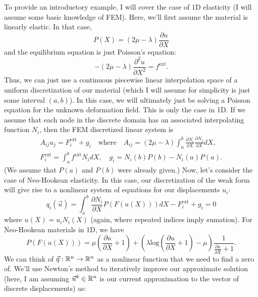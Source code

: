 To provide an introductory example, I will cover the case of 1D elasticity (I will assume some basic knowledge of FEM). Here, we'll first assume the material is linearly elastic. In that case,
\begin{equation*}
P(X) = \left( 2 \mu - \lambda \right) \frac{\partial u}{\partial X}
\end{equation*}
and the equilibrium equation is just Poisson's equation:
\begin{equation*}
-\left( 2 \mu - \lambda \right) \frac{\partial^2 u}{\partial X^2} = f^{\text{ext}}.
\end{equation*}
Thus, we can just use a continuous piecewise linear interpolation space of a uniform discretization of our material (which I will assume for simplicity is just some interval $(a,b)$). In this case, we will ultimately just be solving a Poisson equation for the unknown deformation field. This is only the case in 1D. If we assume that each node in the discrete domain has an associated interpolating function $N_i$, then the FEM discretized linear system is
\begin{gather*}
A_{ij} u_j = F^{\text{ext}}_i + g_i \quad \text{where} \quad A_{ij} = \left( 2 \mu - \lambda \right) \int_a^b \frac{\partial N_i}{\partial X}\frac{\partial N_j}{\partial X} dX, \\
F^{\text{ext}}_i = \int_a^b f^{\text{ext}} N_i dX, \quad g_i = N_i(b) P(b) - N_i(a) P(a).
\end{gather*}
(We assume that $P(a)$ and $P(b)$ were already given.) Now, let's consider the case of Neo-Hookean elasticity. In this case, our discretization of the weak form will give rise to a nonlinear system of equations for our displacements $u_i$:
\begin{equation*}
q_i \left( \vec{u} \right) = \int_a^b \frac{\partial N_i}{\partial X} P(F(u(X))) dX - F^{\text{ext}}_i + g_i = 0
\end{equation*}
where $u(X) = u_i N_i(X)$ (again, where repeated indices imply sumation). For Neo-Hookean materials in 1D, we have
\begin{equation*}
P(F(u(X))) = \mu \left( \frac{\partial u}{\partial X} + 1 \right) + \left( \lambda \text{log} \left( \frac{\partial u}{\partial X} + 1 \right) - \mu \right) \frac{1}{\frac{\partial u}{\partial X} + 1}.
\end{equation*}
We can think of $\vec{q} : \mathbb{R}^n \to \mathbb{R}^n$ as a nonlinear function that we need to find a zero of. We'll use Newton's method to iteratively improve our approximate solution (here, I am assuming $\vec{u}^k \in \mathbb{R}^n$ is our current approximation to the vector of discrete displacements) as:
